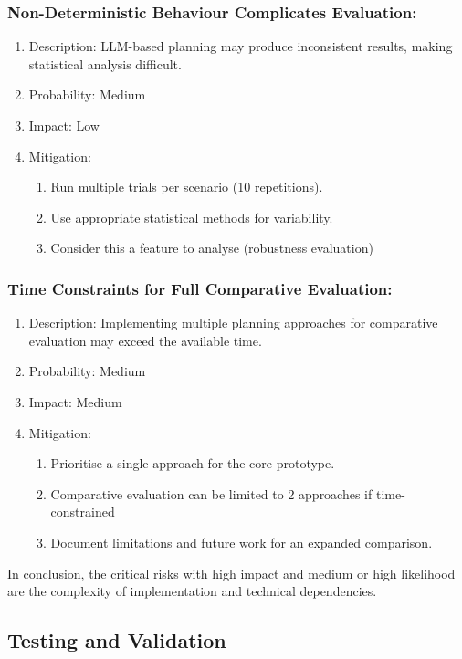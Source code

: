 \documentclass[12pt]{article}
\begin{document}
\subsubsection{Non-Deterministic Behaviour Complicates Evaluation:}
\begin{enumerate}
    \item Description: LLM-based planning may produce inconsistent results, making statistical analysis difficult.
    \item Probability: Medium
    \item Impact: Low
    \item Mitigation: 
  \begin{enumerate}
      \item Run multiple trials per scenario (10 repetitions).
    \item Use appropriate statistical methods for variability.
    \item Consider this a feature to analyse (robustness evaluation)
    \end{enumerate}
\end{enumerate}
\subsubsection{Time Constraints for Full Comparative Evaluation:}
\begin{enumerate}
    \item Description: Implementing multiple planning approaches for comparative evaluation may exceed the available time.
    \item Probability: Medium
    \item Impact: Medium
    \item Mitigation: 
  \begin{enumerate}
      \item Prioritise a single approach for the core prototype.
    \item Comparative evaluation can be limited to 2 approaches if time-constrained
    \item Document limitations and future work for an expanded comparison.
    \end{enumerate}
\end{enumerate}
In conclusion, the critical risks with high impact and medium or high likelihood are the complexity of implementation and technical dependencies.

\subsection{Testing and Validation}
\label{sec:testing}
\end{document}
